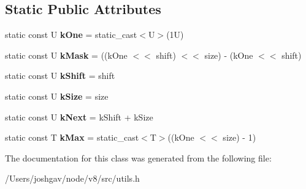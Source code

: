 \subsection*{Static Public Attributes}
\begin{DoxyCompactItemize}
\item 
static const U {\bfseries k\+One} = static\+\_\+cast$<$U$>$(1\+U)\hypertarget{classv8_1_1internal_1_1_bit_field_base_af2b0229ffee57c76f39b6a3aad6d22bb}{}\label{classv8_1_1internal_1_1_bit_field_base_af2b0229ffee57c76f39b6a3aad6d22bb}

\item 
static const U {\bfseries k\+Mask} = ((k\+One $<$$<$ shift) $<$$<$ size) -\/ (k\+One $<$$<$ shift)\hypertarget{classv8_1_1internal_1_1_bit_field_base_a26880a1aa7d61fe08bcf77de9ca46b6f}{}\label{classv8_1_1internal_1_1_bit_field_base_a26880a1aa7d61fe08bcf77de9ca46b6f}

\item 
static const U {\bfseries k\+Shift} = shift\hypertarget{classv8_1_1internal_1_1_bit_field_base_a0b0c87744aa976ba62aadb4552e633ef}{}\label{classv8_1_1internal_1_1_bit_field_base_a0b0c87744aa976ba62aadb4552e633ef}

\item 
static const U {\bfseries k\+Size} = size\hypertarget{classv8_1_1internal_1_1_bit_field_base_a73ac861af5e2f043ea3ef16bc102571b}{}\label{classv8_1_1internal_1_1_bit_field_base_a73ac861af5e2f043ea3ef16bc102571b}

\item 
static const U {\bfseries k\+Next} = k\+Shift + k\+Size\hypertarget{classv8_1_1internal_1_1_bit_field_base_ac924450272ea6ed882a43eba783d3488}{}\label{classv8_1_1internal_1_1_bit_field_base_ac924450272ea6ed882a43eba783d3488}

\item 
static const T {\bfseries k\+Max} = static\+\_\+cast$<$T$>$((k\+One $<$$<$ size) -\/ 1)\hypertarget{classv8_1_1internal_1_1_bit_field_base_a82aada63ffb94bf07ba4702ec9fc1525}{}\label{classv8_1_1internal_1_1_bit_field_base_a82aada63ffb94bf07ba4702ec9fc1525}

\end{DoxyCompactItemize}


The documentation for this class was generated from the following file\+:\begin{DoxyCompactItemize}
\item 
/\+Users/joshgav/node/v8/src/utils.\+h\end{DoxyCompactItemize}
